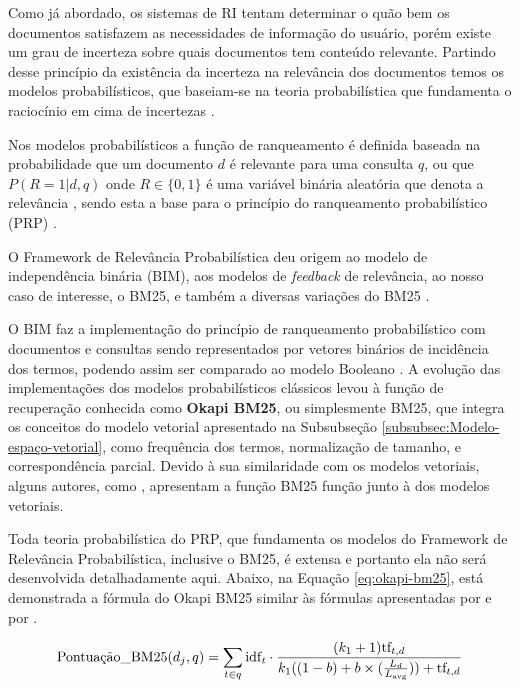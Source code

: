     Como já abordado, os sistemas de RI tentam determinar o quão bem os documentos satisfazem as necessidades de informação do usuário, porém existe um grau de incerteza sobre quais documentos tem conteúdo relevante. 
    Partindo desse princípio da existência da incerteza na relevância dos documentos temos os modelos probabilísticos, que baseiam-se na teoria probabilística que fundamenta o raciocínio em cima de incertezas \cite[p.~201]{Manning2008IIR}. 
    
    Nos modelos probabilísticos a função de ranqueamento é definida baseada na probabilidade que um documento $d$ é relevante para uma consulta $q$, ou que $P(R = 1| d,q)$ onde $R \in \{0, 1\}$ é uma variável binária aleatória que denota a relevância \cite[p.~111--112]{Zhai2016TDMA}, sendo esta a base para o princípio do ranqueamento probabilístico (PRP) \cite[p.~203]{Manning2008IIR}.
    
    O Framework de Relevância Probabilística deu origem ao modelo de independência binária (BIM), aos modelos de \textit{feedback} de relevância, ao nosso caso de interesse, o BM25, e também a diversas variações do BM25 \cite{robertson_probabilistic_2010}. 
    
    O BIM faz a implementação do princípio de ranqueamento probabilístico com documentos e consultas sendo representados por vetores binários de incidência dos termos, podendo assim ser comparado ao modelo Booleano \cite[p.~204]{Manning2008IIR}.
    A evolução das implementações dos modelos probabilísticos clássicos levou à função de recuperação conhecida como \textbf{Okapi BM25}, ou simplesmente BM25, que integra os conceitos do modelo vetorial apresentado na Subsubseção \ref{subsubsec:Modelo-espaço-vetorial}, como frequência dos termos, normalização de tamanho, e correspondência parcial.
    Devido à sua similaridade com os modelos vetoriais, alguns autores, como , apresentam a função BM25 função junto à dos modelos vetoriais.
    
    Toda teoria probabilística do PRP, que fundamenta os modelos do Framework de Relevância Probabilística, inclusive o BM25, é extensa e portanto ela não será  desenvolvida detalhadamente aqui.
    Abaixo, na Equação \ref{eq:okapi-bm25}, está demonstrada a fórmula do Okapi BM25 similar às fórmulas apresentadas por  e por .
    
    \begin{equation}
        \label{eq:okapi-bm25}
		\text{Pontuação\_BM25}(d_j, q) = \sum_{t \in q} \text{idf}_{\text{\textit{t}}} 
		\cdot
		\frac{(k_1 + 1) \text{tf}_{t,d}}{k_1((1-b)+b \times (\frac{L_d}{L_{\text{avg}}})) + \text{tf}_{t,d}} 
    \end{equation}

